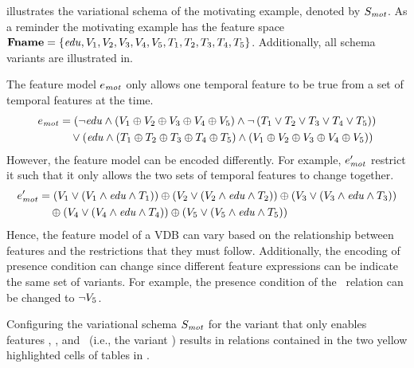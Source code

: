\begin{example}
\label{eg:vsch-mot}
 illustrates the variational schema of the motivating example, denoted by
$\vSch_\mot$. 
As a reminder the motivating example has the feature space $\fSet = \setDef {\edu,
\vOne, \vTwo, \vThree, \vFour, \vFive, \tOne, \tTwo, \tThree, \tFour, \tFive}$. Additionally,
all schema variants are illustrated in. 


The feature model $\dimMeta_\mot$ only allows one temporal feature to be true from a set of temporal features at the time. 
\begin{align*}
\dimMeta_\mot &= 
\left( 
\neg \edu \wedge \left(
\vOne \oplus \vTwo \oplus \vThree \oplus \vFour \oplus \vFive
\right) 
\wedge \neg \left(\tOne \vee \tTwo \vee \tThree \vee \tFour \vee \tFive
 \right)
\right)\\
&\quad\vee 
\left( \edu \wedge \left(
\tOne \oplus \tTwo \oplus \tThree \oplus \tFour \oplus \tFive
\right) \wedge
 \left(
\vOne \oplus \vTwo \oplus \vThree \oplus \vFour \oplus \vFive
\right) \right)
\end{align*}
\noindent
However, the feature model can be encoded differently. For example, $\VVal {\dimMeta_\mot}$ restrict 
it such that it only allows 
the two sets of temporal features to change together.
\begin{align*}
\VVal {\dimMeta_\mot} &= 
\left( \vOne \vee \left(\vOne \wedge \edu \wedge \tOne \right) \right)
\oplus
\left( \vTwo \vee \left(\vTwo \wedge \edu \wedge \tTwo \right) \right)
\oplus
\left( \vThree \vee \left(\vThree \wedge \edu \wedge \tThree \right) \right)\\
&\quad\oplus
\left( \vFour \vee \left(\vFour \wedge \edu \wedge \tFour \right) \right)
\oplus
\left( \vFive \vee \left(\vFive \wedge \edu \wedge \tFive \right) \right)
\end{align*}
\noindent
Hence, the feature model of a VDB can vary based on the relationship between 
features and the restrictions that they must follow.
Additionally, the encoding of presence condition can change since different feature 
expressions can be indicate the same set of variants.
For example, the presence condition of the \job\ relation can be changed to \ensuremath{\neg \vFive}. 

%
Configuring the variational schema $\vSch_\mot$ for the variant that only enables features
\edu, \vTwo, and \tThree\ (i.e., the variant \setDef {\edu, \vTwo, \tThree}) results in 
relations contained in the two yellow highlighted cells of tables in .
\end{example}

